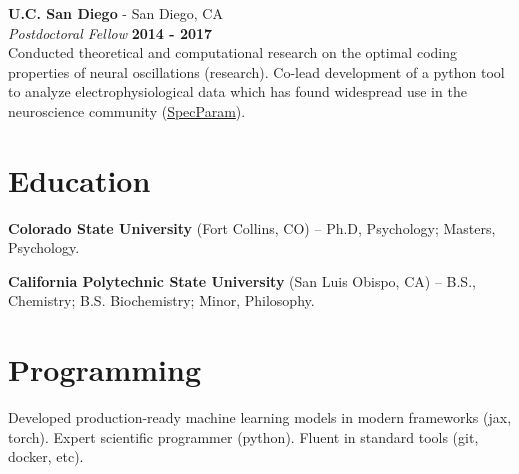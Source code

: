 \documentclass[margin,line]{res}
\begin{document}
\begin{resume}
\vspace{-.1cm}
{\bf U.C. San Diego} - San Diego, CA\\
{\em Postdoctoral Fellow} \hfill {\bf 2014 - 2017}\\
Conducted theoretical and computational research on the optimal coding properties of neural oscillations (research). Co-lead development of a python tool to analyze electrophysiological data which has found widespread use in the neuroscience community (\href{https://github.com/fooof-tools/fooof}{SpecParam}).



\vspace{-.2cm}
\section{\sc Education}
{\bf Colorado State University} (Fort Collins, CO) --  Ph.D, Psychology; Masters, Psychology.\\
\vspace*{-.15in}

\vspace*{-.15in}
{\bf California Polytechnic State University} (San Luis Obispo, CA) -- B.S., Chemistry; B.S. Biochemistry; Minor, Philosophy.\\

\vspace{-.5cm}
\section{\sc Programming} Developed production-ready machine learning models in modern frameworks (jax, torch). Expert scientific programmer (python). Fluent in standard tools (git, docker, etc).


\end{resume}
\end{document}
